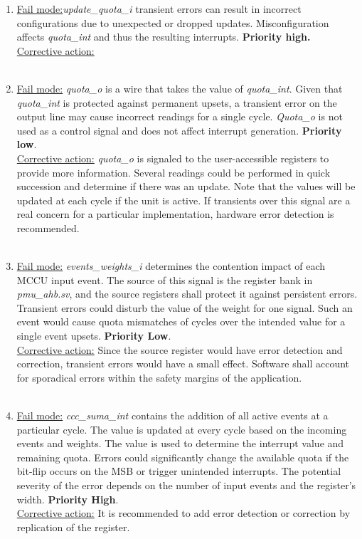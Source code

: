\begin{enumerate}
\\
\item \underline{Fail mode:}\textit{update\_quota\_i} transient errors can result in incorrect configurations due to unexpected or dropped updates. Misconfiguration affects \textit{quota\_int} and thus the resulting interrupts.\textbf{ Priority high.}\\
\underline{Corrective action:}\\
\\
\item \underline{Fail mode:} \textit{quota\_o} is a wire that takes the value of \textit{quota\_int}. Given that \textit{quota\_int} is protected against permanent upsets, a transient error on the output line may cause incorrect readings for a single cycle.\textit{ Quota\_o} is not used as a control signal and does not affect interrupt generation. \textbf{Priority low}.\\
\underline{Corrective action:} \textit{quota\_o} is signaled to the user-accessible registers to provide more information. Several readings could be performed in quick succession and determine if there was an update. Note that the values will be updated at each cycle if the unit is active. If transients over this signal are a real concern for a particular implementation, hardware error detection is recommended. \\
\\
\item \underline{Fail mode:} \textit{events\_weights\_i} determines the contention impact of each MCCU input event. The source of this signal is the register bank in \textit{pmu\_ahb.sv}, and the source registers shall protect it against persistent errors. Transient errors could disturb the value of the weight for one signal. Such an event would cause quota mismatches of  cycles over the intended value for a single event upsets.  \textbf{Priority Low}.\\
\underline{Corrective action:} Since the source register would have error detection and correction, transient errors would have a small effect. Software shall account for sporadical errors within the safety margins of the application. \\
\\
\item \underline{Fail mode:} \textit{ccc\_suma\_int} contains the addition of all active events at a particular cycle. The value is updated at every cycle based on the incoming events and weights. The value is used to determine the interrupt value and remaining quota. Errors could significantly change the available quota if the bit-flip occurs on the MSB or trigger unintended interrupts. The potential severity of the error depends on the number of input events and the register's width. \textbf{Priority High}.\\
\underline{Corrective action:} It is recommended to add error detection or correction by replication of the register.\\
\\
\end{enumerate}
